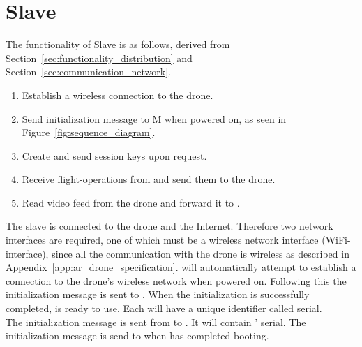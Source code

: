 \section{Slave}
\label{sec:design_slave}
The functionality of Slave is as follows, derived from Section~\ref{sec:functionality_distribution} and Section~\ref{sec:communication_network}.

\begin{enumerate}
	\item Establish a wireless connection to the drone.\label{enum:wireless}
	\item Send initialization message to M when powered on, as seen in Figure~\ref{fig:sequence_diagram}.\label{enum:initialization}
	\item Create and send session keys upon request.\label{enum:session}
	\item Receive flight-operations from  and send them to the drone.\label{enum:actions}
	\item Read video feed from the drone and forward it to .\label{enum:stream}
\end{enumerate}

The slave is connected to the drone and the Internet. %
Therefore two network interfaces are required, one of which must be a wireless network interface (WiFi-interface), since all the communication with the drone is wireless as described in Appendix~\ref{app:ar_drone_specification}.
 will automatically attempt to establish a connection to the drone's wireless network when powered on.
Following this the initialization message is sent to .
When the initialization is successfully completed,  is ready to use.
Each  will have a unique identifier called serial. \\

The initialization message is sent from  to . %
It will contain ' serial.
The initialization message is send to  when  has completed booting. \\

